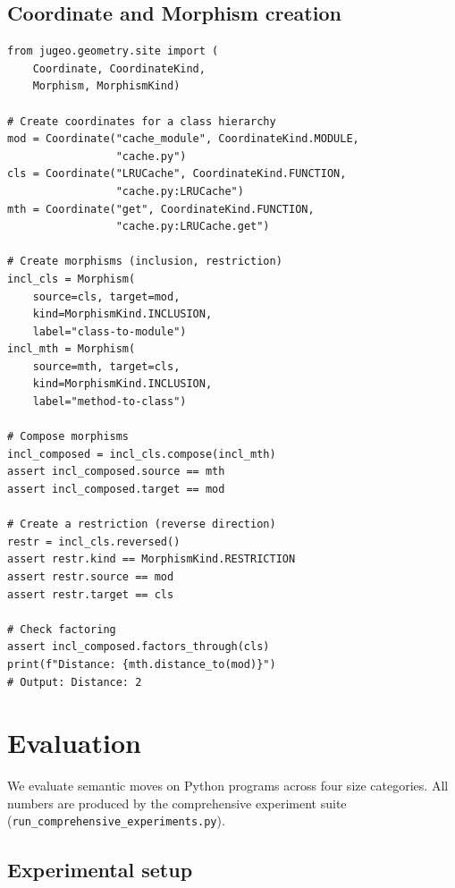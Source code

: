 \documentclass[11pt]{article}
\begin{document}
\subsection{Coordinate and Morphism creation}\label{sec:api-coord-example}

\begin{lstlisting}[caption={Coordinate and Morphism creation and composition.},
                   label=lst:coord-example]
from jugeo.geometry.site import (
    Coordinate, CoordinateKind,
    Morphism, MorphismKind)

# Create coordinates for a class hierarchy
mod = Coordinate("cache_module", CoordinateKind.MODULE,
                 "cache.py")
cls = Coordinate("LRUCache", CoordinateKind.FUNCTION,
                 "cache.py:LRUCache")
mth = Coordinate("get", CoordinateKind.FUNCTION,
                 "cache.py:LRUCache.get")

# Create morphisms (inclusion, restriction)
incl_cls = Morphism(
    source=cls, target=mod,
    kind=MorphismKind.INCLUSION,
    label="class-to-module")
incl_mth = Morphism(
    source=mth, target=cls,
    kind=MorphismKind.INCLUSION,
    label="method-to-class")

# Compose morphisms
incl_composed = incl_cls.compose(incl_mth)
assert incl_composed.source == mth
assert incl_composed.target == mod

# Create a restriction (reverse direction)
restr = incl_cls.reversed()
assert restr.kind == MorphismKind.RESTRICTION
assert restr.source == mod
assert restr.target == cls

# Check factoring
assert incl_composed.factors_through(cls)
print(f"Distance: {mth.distance_to(mod)}")
# Output: Distance: 2
\end{lstlisting}


\section{Evaluation}\label{sec:eval}

We evaluate semantic moves on \compTotalPrograms{} Python programs across
four size categories.  All numbers
are produced by the comprehensive experiment suite
(\texttt{run\_comprehensive\_experiments.py}).

\subsection{Experimental setup}\label{sec:eval-setup}
\end{document}
